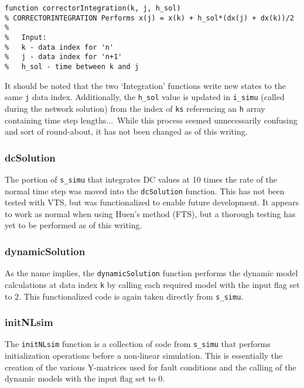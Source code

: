 \begin{verbatim}
function correctorIntegration(k, j, h_sol)
% CORRECTORINTEGRATION Performs x(j) = x(k) + h_sol*(dx(j) + dx(k))/2
%
%   Input:
%   k - data index for 'n'
%   j - data index for 'n+1'
%   h_sol - time between k and j
\end{verbatim}

It should be noted that the two `Integration' functions write new states to the same \verb|j| data index.
Additionally, the \verb|h_sol| value is updated in \verb|i_simu| (called during the network solution) from the index of \verb|ks| referencing an \verb|h| array containing time step lengths$\ldots$\ 
While this process seemed unnecessarily confusing and sort of  round-about, it has not been changed as of this writing.


\subsubsection{dcSolution}  
The portion of \verb|s_simu| that integrates DC values at 10 times the rate of the normal time step was moved into the \verb|dcSolution| function.
This has not been tested with VTS, but was functionalized to enable future development.
It appears to work as normal when using Huen's method (FTS), but a thorough testing has yet to be performed as of this writing.

\subsubsection{dynamicSolution}  
As the name implies, the \verb|dynamicSolution| function performs the dynamic model calculations at data index \verb|k| by calling each required model with the input flag set to 2.
This functionalized code is again taken directly from \verb|s_simu|.



\subsubsection{initNLsim}  
The \verb|initNLsim| function is a collection of code from \verb|s_simu| that performs initialization operations before a non-linear simulation.
This is essentially the creation of the various Y-matrices used for fault conditions and the calling of the dynamic models with the input flag set to 0.

